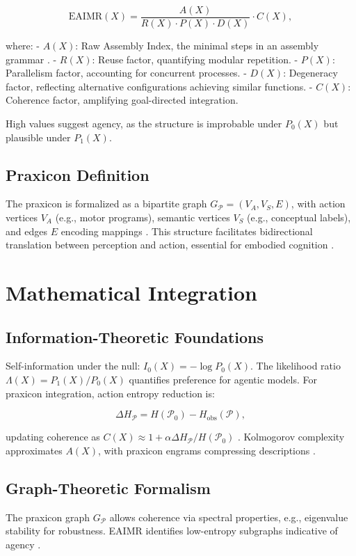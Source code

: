 \documentclass{article}
\begin{document}
\[
\text{EAIMR}(X) = \frac{A(X)}{R(X) \cdot P(X) \cdot D(X)} \cdot C(X),
\]

where:
- \(A(X)\): Raw Assembly Index, the minimal steps in an assembly grammar \citep{walker2013}.
- \(R(X)\): Reuse factor, quantifying modular repetition.
- \(P(X)\): Parallelism factor, accounting for concurrent processes.
- \(D(X)\): Degeneracy factor, reflecting alternative configurations achieving similar functions.
- \(C(X)\): Coherence factor, amplifying goal-directed integration.

High values suggest agency, as the structure is improbable under \(P_0(X)\) but plausible under \(P_1(X)\).

\subsection{Praxicon Definition}
The praxicon is formalized as a bipartite graph \(G_{\mathcal{P}} = (V_A, V_S, E)\), with action vertices \(V_A\) (e.g., motor programs), semantic vertices \(V_S\) (e.g., conceptual labels), and edges \(E\) encoding mappings \citep{panunzi2018}. This structure facilitates bidirectional translation between perception and action, essential for embodied cognition \citep{barsalou2008}.

\section{Mathematical Integration}
\label{sec:integration}

\subsection{Information-Theoretic Foundations}
Self-information under the null: \(I_0(X) = -\log P_0(X)\). The likelihood ratio \(\Lambda(X) = P_1(X)/P_0(X)\) quantifies preference for agentic models. For praxicon integration, action entropy reduction is:

\[
\Delta H_{\mathcal{P}} = H(\mathcal{P}_0) - H_{\text{obs}}(\mathcal{P}),
\]

updating coherence as \(C(X) \approx 1 + \alpha \Delta H_{\mathcal{P}} / H(\mathcal{P}_0)\) \citep{shannon1948, jaynes2003}. Kolmogorov complexity approximates \(A(X)\), with praxicon engrams compressing descriptions \citep{kolmogorov1965}.

\subsection{Graph-Theoretic Formalism}
The praxicon graph \(G_{\mathcal{P}}\) allows coherence via spectral properties, e.g., eigenvalue stability for robustness. EAIMR identifies low-entropy subgraphs indicative of agency \citep{newell1990}.
\end{document}
